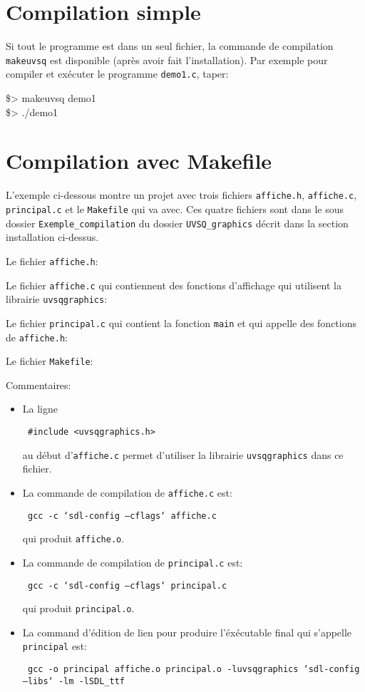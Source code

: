 \documentclass{report}
\newcommand\code[1]{
\begin{mdframed}[linecolor=purple,backgroundcolor=blue!10]
{\tt
#1
}
\end{mdframed}
}
\begin{document}
\section{Compilation simple}
Si tout le programme est dans un seul fichier, la commande de compilation \texttt{makeuvsq} est disponible (après avoir fait l'installation).
Par exemple pour compiler et exécuter le programme \texttt{demo1.c}, taper:
\code{
\$> makeuvsq demo1\\
\$> ./demo1
}

\section{Compilation avec Makefile}
L'exemple ci-dessous montre un projet avec trois fichiers \texttt{affiche.h}, \texttt{affiche.c}, \texttt{principal.c} 
et le \texttt{Makefile} qui va avec. Ces quatre fichiers sont dans le sous dossier \texttt{Exemple\_compilation} du dossier \texttt{UVSQ\_graphics} décrit dans la section installation ci-dessus.

\vspace{5mm}
Le fichier \texttt{affiche.h}:
\code{  }

Le fichier \texttt{affiche.c} qui contiennent des fonctions d'affichage qui utilisent la librairie \texttt{uvsqgraphics}:\code{  }

Le fichier \texttt{principal.c} qui contient la fonction \texttt{main} et qui appelle des fonctions de \texttt{affiche.h}:
\code{  }

Le fichier \texttt{Makefile}:
\code{  }

\vspace{5mm}
Commentaires:
\begin{itemize}
\item La ligne
	\code{\#include <uvsqgraphics.h>}
	au début d'\texttt{affiche.c} permet d'utiliser la librairie \texttt{uvsqgraphics} dans ce fichier.
\item La commande de compilation de \texttt{affiche.c} est:
	\code{gcc -c `sdl-config --cflags` affiche.c}
	qui produit \texttt{affiche.o}.
\item La commande de compilation de \texttt{principal.c} est:
	\code{gcc -c `sdl-config --cflags` principal.c}
	qui produit \texttt{principal.o}.
\item La command d'édition de lien pour produire l'éxécutable final qui s'appelle \texttt{principal} est:
	\code{gcc -o principal affiche.o principal.o -luvsqgraphics `sdl-config --libs` -lm -lSDL\_ttf}
\end{itemize}
\end{document}
